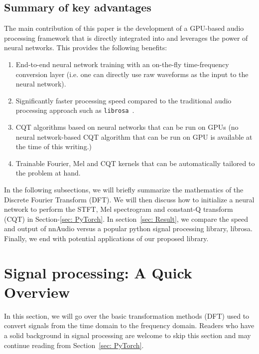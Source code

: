 \documentclass{ieeeaccess}
\newcommand{\nbh}[1]{\texttt{#1}}
\begin{document}
\subsection{Summary of key advantages}
{The main contribution of this paper is the development of a GPU-based audio processing framework that is directly integrated into and leverages the power of neural networks. This provides the following benefits:
\begin{enumerate}
  \item End-to-end neural network training with an on-the-fly time-frequency conversion layer (i.e. one can directly use raw waveforms as the input to the neural network).
  \item Significantly faster processing speed compared to the traditional audio processing approach {such as \nbh{librosa}~\cite{mcfee2015Librosa}.}
  \item {CQT algorithms based on neural networks that can be run on GPUs (no neural network-based CQT algorithm that can be run on GPU is available at the time of this writing.)}
  \item Trainable Fourier, Mel and CQT kernels that can be automatically tailored to the problem at hand.
\end{enumerate}}



In the following subsections, we will briefly summarize the mathematics of the Discrete Fourier Transform (DFT). We will then discuss how to initialize a neural network to perform the STFT, Mel spectrogram and constant-Q transform (CQT) in Section-\ref{sec: PyTorch}. In section~\ref{sec: Result}, we compare the speed and output of nnAudio versus a popular python signal processing library, librosa. Finally, we end with potential applications of our proposed library. 


\section{Signal processing: A Quick Overview}
In this section, we will go over the basic transformation methods (DFT) used to convert signals from the time domain to the frequency domain. {Readers who have a solid background in signal processing are welcome to skip this section and may continue reading from Section~\ref{sec: PyTorch}.}
\end{document}
